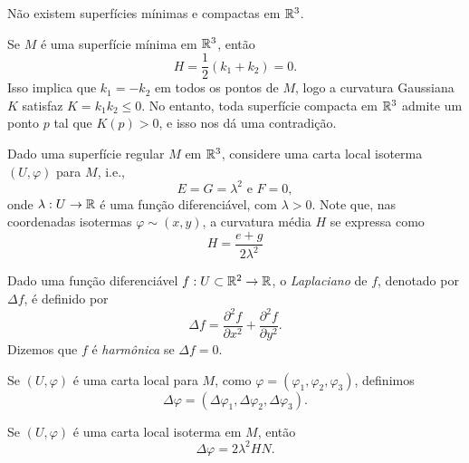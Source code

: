 \begin{proposicao}
	Não existem superfícies mínimas e compactas em $\mathbb{R}^3$.
\end{proposicao}

\begin{demonstracao}
	Se $M$ é uma superfície mínima em $\mathbb{R}^3$, então
	\begin{equation*}
		H = \frac{1}{2} (k_1 + k_2) = 0.
	\end{equation*}
	Isso implica que $k_1=-k_2$ em todos os pontos de $M$, logo a curvatura Gaussiana $K$ satisfaz $K = k_1 k_2 \leq 0$. No entanto, toda superfície compacta em $\mathbb{R}^3$ admite um ponto $p$ tal que $K(p)>0$, e isso nos dá uma contradição.
\end{demonstracao}

Dado uma superfície regular $M$ em $\mathbb{R}^3$, considere uma carta local isoterma $(U,\varphi)$ para $M$, i.e., 
\begin{equation*}
E = G = \lambda^2 \text{ e } F=0,
\end{equation*}
onde $\lambda: U \rightarrow \mathbb{R}$ é uma função diferenciável, com $\lambda > 0$. Note que, nas coordenadas isotermas $\varphi \sim (x,y)$, a curvatura média $H$ se expressa como
\begin{equation*}
H = \frac{e + g}{2 \lambda^2}
\end{equation*}

\begin{definicao}
	Dado uma função diferenciável $f: U \subset \mathbb{R}^2 \rightarrow \mathbb{R}$, o \emph{Laplaciano} de $f$, denotado por $\Delta f$, é definido por
	\begin{equation*}
	\Delta f = \frac{\partial^2 f}{\partial x^2} + \frac{\partial^2 f}{\partial y^2}.
	\end{equation*}
	Dizemos que $f$ é \emph{harmônica} se $\Delta f = 0$.
	
	Se $(U, \varphi)$ é uma carta local para $M$, como $\varphi = (\varphi_1, \varphi_2, \varphi_3)$, definimos
	\begin{equation*}
	\Delta \varphi = (\Delta \varphi_1, \Delta \varphi_2, \Delta \varphi_3).
	\end{equation*}
\end{definicao}

\begin{proposicao}
	Se $(U, \varphi)$ é uma carta local isoterma em $M$, então 
	\begin{equation*}
	\Delta \varphi = 2 \lambda^2 H N.
	\end{equation*}
\end{proposicao}

